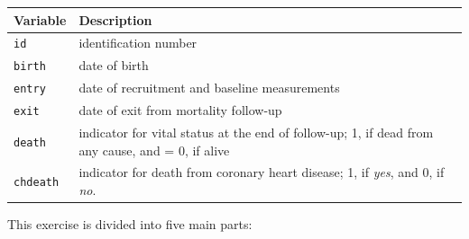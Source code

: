 \documentclass[
]{book}
\newcounter{none} %
\begin{document}
{\def\LTcaptype{none} %
\begin{longtable}[]{@{}
  >{\raggedright\arraybackslash}p{}
  >{\raggedright\arraybackslash}p{}@{}}
\toprule\noalign{}
\begin{minipage}[b]{\linewidth}\raggedright
Variable
\end{minipage} & \begin{minipage}[b]{\linewidth}\raggedright
Description
\end{minipage} \\
\midrule\noalign{}
\endhead
\bottomrule\noalign{}
\endlastfoot
\texttt{id} & identification number \\
\texttt{birth} & date of birth \\
\texttt{entry} & date of recruitment and baseline measurements \\
\texttt{exit} & date of exit from mortality follow-up \\
\texttt{death} & indicator for vital status at the end of follow-up; 1, if dead from any cause, and = 0, if alive \\
\texttt{chdeath} & indicator for death from coronary heart disease; 1, if \emph{yes}, and 0, if \emph{no}. \\
\end{longtable}
}

This exercise is divided into five main parts:
\end{document}
